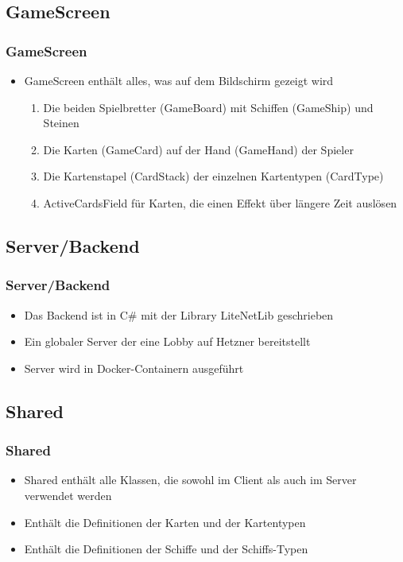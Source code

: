 \documentclass{beamer}
\begin{document}
\subsection{GameScreen}
\begin{frame}
\frametitle{GameScreen}
  \begin{itemize}
    \item GameScreen enthält alles, was auf dem Bildschirm gezeigt wird
      \begin{enumerate}
        \item Die beiden Spielbretter (GameBoard) mit Schiffen (GameShip) und Steinen
        \item Die Karten (GameCard) auf der Hand (GameHand) der Spieler
        \item Die Kartenstapel (CardStack) der einzelnen Kartentypen (CardType)
        \item ActiveCardsField für Karten, die einen Effekt über längere Zeit auslösen
      \end{enumerate}
  \end{itemize}
  
\end{frame}


\subsection{Server/Backend}
\begin{frame}
\frametitle{Server/Backend}
  \begin{itemize}
    \item Das Backend ist in C\# mit der Library LiteNetLib geschrieben
    \item Ein globaler Server der eine Lobby auf Hetzner bereitstellt
    \item Server wird in Docker-Containern ausgeführt
  \end{itemize}
\end{frame}

\subsection{Shared}
\begin{frame}
\frametitle{Shared}
  \begin{itemize}
    \item Shared enthält alle Klassen, die sowohl im Client als auch im Server verwendet werden
    \item Enthält die Definitionen der Karten und der Kartentypen
    \item Enthält die Definitionen der Schiffe und der Schiffs-Typen
  \end{itemize}
\end{frame}
\end{document}
